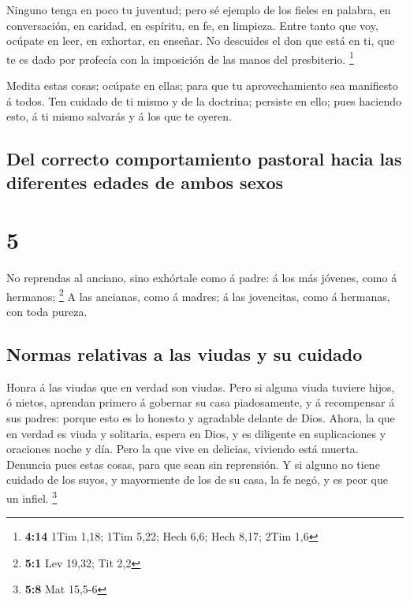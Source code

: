  Ninguno tenga en poco tu juventud; pero sé ejemplo de los
fieles en palabra, en conversación, en caridad, en espíritu, en fe, en
limpieza.  Entre tanto que voy, ocúpate en leer, en
exhortar, en enseñar.  No descuides el don que está en ti,
que te es dado por profecía con la imposición de las manos del
presbiterio. \footnote{\textbf{4:14} 1Tim 1,18; 1Tim 5,22; Hech 6,6;
  Hech 8,17; 2Tim 1,6}

 Medita estas cosas; ocúpate en ellas; para que tu
aprovechamiento sea manifiesto á todos.  Ten cuidado de ti
mismo y de la doctrina; persiste en ello; pues haciendo esto, á ti mismo
salvarás y á los que te oyeren.

\hypertarget{del-correcto-comportamiento-pastoral-hacia-las-diferentes-edades-de-ambos-sexos}{%
\subsection{Del correcto comportamiento pastoral hacia las diferentes
edades de ambos
sexos}\label{del-correcto-comportamiento-pastoral-hacia-las-diferentes-edades-de-ambos-sexos}}

\hypertarget{section-4}{%
\section{5}\label{section-4}}

 No reprendas al anciano, sino exhórtale como á padre: á los
más jóvenes, como á hermanos; \footnote{\textbf{5:1} Lev 19,32; Tit 2,2}
 A las ancianas, como á madres; á las jovencitas, como á
hermanas, con toda pureza.

\hypertarget{normas-relativas-a-las-viudas-y-su-cuidado}{%
\subsection{Normas relativas a las viudas y su
cuidado}\label{normas-relativas-a-las-viudas-y-su-cuidado}}

 Honra á las viudas que en verdad son viudas. 
Pero si alguna viuda tuviere hijos, ó nietos, aprendan primero á
gobernar su casa piadosamente, y á recompensar á sus padres: porque esto
es lo honesto y agradable delante de Dios.  Ahora, la que en
verdad es viuda y solitaria, espera en Dios, y es diligente en
suplicaciones y oraciones noche y día.  Pero la que vive en
delicias, viviendo está muerta.  Denuncia pues estas cosas,
para que sean sin reprensión.  Y si alguno no tiene cuidado
de los suyos, y mayormente de los de su casa, la fe negó, y es peor que
un infiel. \footnote{\textbf{5:8} Mat 15,5-6}

